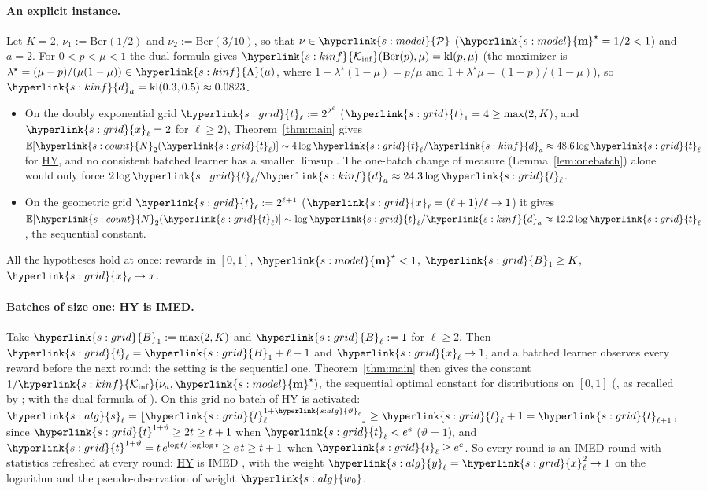 \documentclass[10pt]{article}
\newcommand{\sy}[2]{{\hyperlink{#1}{#2}}}
\newcommand{\E}{\mathbb{E}}
\newcommand{\1}{\mathbf{1}}
\newcommand{\kl}{\mathrm{kl}}
\newcommand{\Ber}{\mathrm{Ber}}
\newcommand{\m}{\sy{s:model}{\mathbf{m}}}
\newcommand{\cP}{\sy{s:model}{\mathcal P}}
\newcommand{\Ki}{\sy{s:kinf}{\mathcal K_{\inf}}}
\newcommand{\Lset}[1]{\sy{s:kinf}{\Lambda}(#1)}
\newcommand{\da}{\sy{s:kinf}{d}_a}
\newcommand{\Ng}{\sy{s:count}{N}}
\newcommand{\tl}{\sy{s:grid}{t}}
\newcommand{\xg}{\sy{s:grid}{x}}
\newcommand{\Bg}{\sy{s:grid}{B}}
\newcommand{\HY}{\hyperref[def:hy]{\textup{HY}}}
\newcommand{\wz}{\sy{s:alg}{w_0}}
\newcommand{\yg}{\sy{s:alg}{y}}
\newcommand{\sA}{\sy{s:alg}{s}}
\newcommand{\thv}{\sy{s:alg}{\vartheta}}
\begin{document}
\paragraph{An explicit instance.} Let $K=2$, $\nu_1:=\Ber(1/2)$ and $\nu_2:=\Ber(3/10)$, so that $\nu\in\cP$ ($\m^\star=1/2<1$) and $a=2$. For $0<p<\mu<1$ the dual
formula gives $\Ki(\Ber(p),\mu)=\kl(p,\mu)$ (the maximizer is $\lambda^\star=(\mu-p)/(\mu(1-\mu))\in\Lset{\mu}$, where $1-\lambda^\star(1-\mu)=p/\mu$ and
$1+\lambda^\star\mu=(1-p)/(1-\mu)$), so $\da=\kl(0.3,0.5)\approx0.0823$.
\begin{itemize}[leftmargin=*,nosep]
\item On the doubly exponential grid $\tl_\ell:=2^{2^\ell}$ ($\tl_1=4\ge\max(2,K)$, and $\xg_\ell=2$ for $\ell\ge2$), Theorem~\ref{thm:main} gives
$\E[\Ng_2(\tl_\ell)]\sim4\log\tl_\ell/\da\approx48.6\log\tl_\ell$ for \HY, and no consistent batched learner has a smaller $\limsup$. The one-batch change of measure
(Lemma~\ref{lem:onebatch}) alone would only force $2\log\tl_\ell/\da\approx24.3\log\tl_\ell$.
\item On the geometric grid $\tl_\ell:=2^{\ell+1}$ ($\xg_\ell=(\ell+1)/\ell\to1$) it gives $\E[\Ng_2(\tl_\ell)]\sim\log\tl_\ell/\da\approx12.2\log\tl_\ell$, the sequential
constant.
\end{itemize}
All the hypotheses hold at once: rewards in $[0,1]$, $\m^\star<1$, $\Bg_1\ge K$, $\xg_\ell\to x$.

\paragraph{Batches of size one: HY is IMED.} Take $\Bg_1:=\max(2,K)$ and $\Bg_\ell:=1$ for $\ell\ge2$. Then $\tl_\ell=\Bg_1+\ell-1$ and $\xg_\ell\to1$, and a batched
learner observes every reward before the next round: the setting is the sequential one. Theorem~\ref{thm:main} then gives the constant $1/\Ki(\nu_a,\m^\star)$, the
sequential optimal constant for distributions on $[0,1]$ (\citealp[Proposition~1]{BK96}, as recalled by \citealp[(2)]{HT10}; with the dual formula of
\citealp[Theorem~8]{HT10}). On this grid no batch of \HY{} is activated:
$\sA_\ell=\lfloor\tl_\ell^{1+\thv_\ell}\rfloor\ge\tl_\ell+1=\tl_{\ell+1}$, since $\tl^{1+\vartheta}\ge2t\ge t+1$ when $\tl_\ell<e^e$ ($\vartheta=1$), and
$\tl^{1+\vartheta}=t\,e^{\log t/\log\log t}\ge e\,t\ge t+1$ when $\tl_\ell\ge e^e$. So every round is an IMED round with statistics refreshed at every round: \HY{} is IMED
\citep{HT15}, with the weight $\yg_\ell=\xg_\ell^2\to1$ on the logarithm and the pseudo-observation of weight $\wz$.
\end{document}
